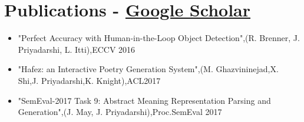 \newcommand\textlcsc[1]{\textsc{\MakeTextLowercase{#1}}}
\section{Publications - \href{https://scholar.google.com/citations?user=jGa34X4AAAAJ&hl=en}{Google Scholar}}
\begin{itemize}
\setlength\itemsep{-5pt}
\item "Perfect Accuracy with Human-in-the-Loop Object Detection",(R. Brenner, J. Priyadarshi, L. Itti),ECCV 2016
\item "Hafez: an Interactive Poetry Generation System",(M. Ghazvininejad,X. Shi,J. Priyadarshi,K. Knight),ACL2017
\item "SemEval-2017 Task 9: Abstract Meaning Representation Parsing and Generation",(J. May, J. Priyadarshi),Proc.SemEval 2017
\end{itemize}

